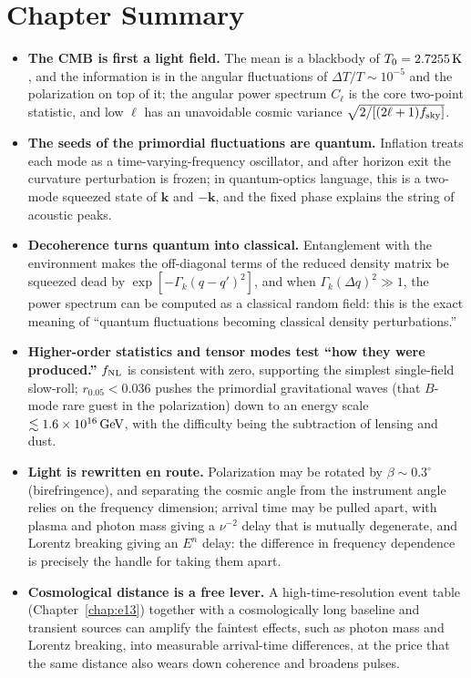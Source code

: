 \section*{Chapter Summary}

\begin{itemize}
\item \textbf{The CMB is first a light field.} The mean is a blackbody of \(T_0=2.7255\,{\rm K}\), and the information is in the angular fluctuations of \(\Delta T/T\sim10^{-5}\) and the polarization on top of it; the angular power spectrum \(C_\ell\) is the core two-point statistic, and low \(\ell\) has an unavoidable cosmic variance \(\sqrt{2/[(2\ell+1)f_{\rm sky}]}\).
\item \textbf{The seeds of the primordial fluctuations are quantum.} Inflation treats each mode as a time-varying-frequency oscillator, and after horizon exit the curvature perturbation is frozen; in quantum-optics language, this is a two-mode squeezed state of \(\bm k\) and \(-\bm k\), and the fixed phase explains the string of acoustic peaks.
\item \textbf{Decoherence turns quantum into classical.} Entanglement with the environment makes the off-diagonal terms of the reduced density matrix be squeezed dead by \(\exp[-\Gamma_k(q-q')^2]\), and when \(\Gamma_k(\Delta q)^2\gg1\), the power spectrum can be computed as a classical random field: this is the exact meaning of ``quantum fluctuations becoming classical density perturbations.''
\item \textbf{Higher-order statistics and tensor modes test ``how they were produced.''} \(f_{\rm NL}\) is consistent with zero, supporting the simplest single-field slow-roll; \(r_{0.05}<0.036\) pushes the primordial gravitational waves (that \(B\)-mode rare guest in the polarization) down to an energy scale \(\lesssim1.6\times10^{16}\,{\rm GeV}\), with the difficulty being the subtraction of lensing and dust.
\item \textbf{Light is rewritten en route.} Polarization may be rotated by \(\beta\sim0.3^\circ\) (birefringence), and separating the cosmic angle from the instrument angle relies on the frequency dimension; arrival time may be pulled apart, with plasma and photon mass giving a \(\nu^{-2}\) delay that is mutually degenerate, and Lorentz breaking giving an \(E^{n}\) delay: the difference in frequency dependence is precisely the handle for taking them apart.
\item \textbf{Cosmological distance is a free lever.} A high-time-resolution event table (Chapter~\ref{chap:e13}) together with a cosmologically long baseline and transient sources can amplify the faintest effects, such as photon mass and Lorentz breaking, into measurable arrival-time differences, at the price that the same distance also wears down coherence and broadens pulses.
\end{itemize}

